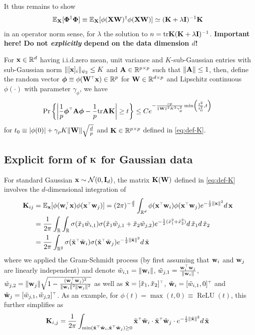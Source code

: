 \documentclass[11pt]{article}
\newcommand{\bphi}{\boldsymbol{\phi}}
\newcommand{\bPhi}{\boldsymbol{\Phi}}
\DeclareMathOperator{\ReLU}{ReLU}
\begin{document}
It thus remains to show
\[
  \E_\X[\bPhi^\dagger \bPhi] \equiv \E_\X[\phi(\X \W)^\dagger \phi(\X \W)] \simeq (\K + \lambda \I)^{-1} \K
\]
in an operator norm sense, for $\lambda$ the solution to $n = \mathrm{tr} \mathbf K (\mathbf K + \lambda \mathbf I)^{-1}$. \textbf{Important here! Do not \emph{explicitly} depend on the data dimension $d$!}

\begin{lemma}
For $\mathbf x \in \mathbb R^d$ having i.i.d.\@ zero mean, unit variance and $K$-sub-Gaussian entries with sub-Gaussian norm $\| [\mathbf x]_i \|_{\psi_2} \le K$ and $\mathbf A \in \mathbb R^{p \times p}$ such that $\| \mathbf A \| \le 1$, then, define the random vector $\bphi \equiv \phi(\W^\top \x) \in \R^p$ for $\mathbf W \in \mathbb R^{d \times p}$ and Lipschitz continuous $\phi(\cdot)$ with parameter $\gamma_\phi$, we have
\[
  \Pr \left\{ \left| \frac1p \bphi^\top \A \bphi - \frac1p \tr \A \K \right| \ge t \right\} \le C e^{- \frac{c p}{ \| \W \|^2 K^2 \gamma_\phi^2 } \min \left( \frac{t^2}{t_0^2}, t \right) }
\]
for $t_0 \equiv |\phi(0)| + \gamma_\rho K \| \mathbf W \| \sqrt{ \frac{d}{p} }$ and $\mathbf K \in \mathbb R^{p \times p}$ defined in \eqref{eq:def-K}.
\end{lemma}

\subsection{Explicit form of \texorpdfstring{$\mathbf K$}{K} for Gaussian data}

For standard Gaussian $\mathbf x \sim \mathcal N(0,\mathbf I_d)$, the matrix $\mathbf K(\mathbf W)$ defined in \eqref{eq:def-K} involves the $d$-dimensional integration of
\begin{align*}
  \K_{ij} &= \E_\x[\phi(\w_i^\top \x) \phi(\x^\top \w_j)] = (2\pi)^{-\frac{d}2} \int_{\mathbb{R}^d} \phi(\x^\top \w_i) \phi(\x^\top \w_j) e^{-\frac12 \|\x\|^2} d\,\x \\ 
  &= \frac1{2\pi} \int_{\mathbb{R}} \int_{\mathbb{R}} \sigma(\tilde x_1 \tilde w_{i,1}) \sigma(\tilde x_1 \tilde w_{j,1} + \tilde x_2 \tilde w_{j,2}) e^{-\frac12 (\tilde x_1^2 + \tilde x_2^2) } d\,\tilde x_1 d\,\tilde x_2 \\
  &= \frac1{2\pi} \int_{\mathbb{R}^2} \sigma(\tilde \x^\top \tilde \w_i) \sigma(\tilde \x^\top \tilde \w_j) e^{-\frac12 \|\tilde \x\|^2} d\,\tilde \x
\end{align*}
where we applied the Gram-Schmidt process (by first assuming that $\mathbf w_i$ and $\mathbf w_j$ are linearly independent) and denote $\tilde w_{i,1} = \|\mathbf w_i\|$, $\tilde w_{j,1} = \frac{\w_i^\top \w_j}{\|\w_i\|}$, $\tilde w_{j,2} = \|\w_j\| \sqrt{ 1 - \frac{(\w_i^\top \w_j)^2}{ \|\w_i\|^2 \|\w_j\|^2 } }$ as well as $\tilde \x = [\tilde x_1, \tilde x_2]^\top$, $\tilde \w_i = [\tilde w_{i,1},0]^\top$ and $\tilde \w_j = [\tilde w_{j,1},\tilde w_{j,2}]^\top$. As an example, for $\phi(t) = \max(t,0) \equiv \ReLU(t)$, this further simplifies as
\begin{align*}
  \K_{i,j} = \frac1{2\pi} \int_{ \min(\tilde \x^\top \tilde \w_i, \tilde \x^\top \tilde \w_j) \ge 0} \tilde \x^\top \tilde \w_i \cdot \tilde \x^\top \tilde \w_j \cdot e^{-\frac12 \|\tilde \x\|^2} d\,\tilde \x
\end{align*}
\end{document}
